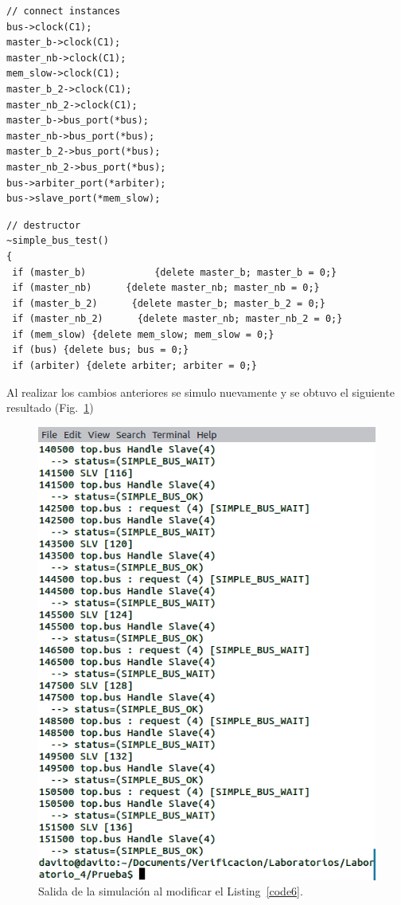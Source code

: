 \documentclass[twocolumn]{IEEEtran}
\begin{document}
\lstset{numbers=left, numberstyle=\footnotesize , stepnumber=1, numbersep=1pt}
\begin{lstlisting}[firstnumber=83, caption=Código modificado para la declaración del clock en el constructor., label=code5]
// connect instances
bus->clock(C1);
master_b->clock(C1);
master_nb->clock(C1);
mem_slow->clock(C1);
master_b_2->clock(C1);
master_nb_2->clock(C1);
master_b->bus_port(*bus);
master_nb->bus_port(*bus);
master_b_2->bus_port(*bus);
master_nb_2->bus_port(*bus);
bus->arbiter_port(*arbiter);
bus->slave_port(*mem_slow);
\end{lstlisting}
\lstset{numbers=left, numberstyle=\footnotesize , stepnumber=1, numbersep=1pt}
\begin{lstlisting}[firstnumber=101, caption=Código modificado para la declaración del destructor., label=code6]
// destructor
~simple_bus_test()
{
 if (master_b)            {delete master_b; master_b = 0;} 
 if (master_nb)      {delete master_nb; master_nb = 0;}
 if (master_b_2)      {delete master_b; master_b_2 = 0;}
 if (master_nb_2)      {delete master_nb; master_nb_2 = 0;}
 if (mem_slow) {delete mem_slow; mem_slow = 0;}
 if (bus) {delete bus; bus = 0;}
 if (arbiter) {delete arbiter; arbiter = 0;}
\end{lstlisting}
\noindent
Al realizar los cambios anteriores se simulo nuevamente y se obtuvo el siguiente resultado (Fig.~\ref{fig3})
\begin{figure}[H]
  \centering
    \includegraphics[scale=0.48]{fig3.png}
  \caption{Salida de la simulación al modificar el Listing~\ref{code6}.}
 \label{fig3}
\end{figure}
\end{document}
